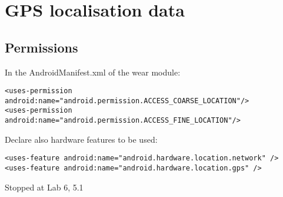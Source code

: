 \documentclass[11pt]{article}
\begin{document}
\section{GPS localisation data}
\subsection{Permissions}
In the AndroidManifest.xml of the wear module:
\begin{lstlisting}
<uses-permission android:name="android.permission.ACCESS_COARSE_LOCATION"/>
<uses-permission android:name="android.permission.ACCESS_FINE_LOCATION"/>
\end{lstlisting}
Declare also hardware features to be used:
\begin{lstlisting}
<uses-feature android:name="android.hardware.location.network" />
<uses-feature android:name="android.hardware.location.gps" />
\end{lstlisting}

Stopped at Lab 6, 5.1
\end{document}
